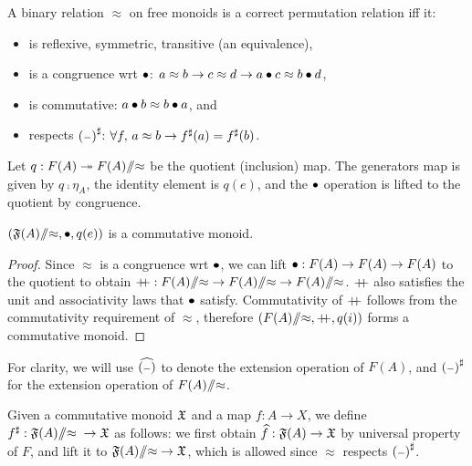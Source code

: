 \begin{definition}
    \label{def:permutation-relation}
    \leavevmode
    A binary relation $\approx$ on free monoids is a correct permutation relation iff it:
    \begin{itemize}
        \item is reflexive, symmetric, transitive (an equivalence),
        \item is a congruence wrt $\mathbin{\bullet}$: $a \approx b \to c \approx d \to a \mathbin{\bullet} c \approx b \mathbin{\bullet} d$,
        \item is commutative: $a \mathbin{\bullet} b \approx b \mathbin{\bullet} a$, and
        \item respects $\ext{(\blank)}$: $\forall f, \, a \approx b \to {f}^{\sharp}(a) = {f}^{\sharp}(b)$.
    \end{itemize}
\end{definition}

Let $q : F(A) \twoheadrightarrow {F(A)}{\sslash}{\approx}$ be the quotient (inclusion) map.
%
The generators map is given by $q \comp \eta_A$, the identity element is $q(e)$,
and the $\mathbin{\bullet}$ operation is lifted to the quotient by congruence.

\begin{propositionrep}
    $({\mathfrak{F}(A)}{\sslash}{\approx}, \mathbin{\bullet}, q(e))$ is a commutative monoid.
\end{propositionrep}
\begin{proof}
    Since $\approx$ is a congruence wrt $\mathbin{\bullet}$,
    we can lift $\mathbin{\bullet} : F(A) \to F(A) \to F(A)$ to the quotient to obtain
    $\mathbin{+\kern -0.4em+} : {F(A)}{\sslash}{\approx} \to {F(A)}{\sslash}{\approx} \to {F(A)}{\sslash}{\approx}$.
    $\mathbin{+\kern -0.4em+}$ also satisfies the unit and associativity laws that $\mathbin{\bullet}$ satisfy.
    Commutativity of $\mathbin{+\kern -0.4em+}$ follows from the commutativity requirement of $\approx$,
    therefore $({F(A)}{\sslash}{\approx}, \mathbin{+\kern -0.4em+}, q(i))$ forms a commutative monoid.
\end{proof}
\noindent
For clarity, we will use $\exthat{(\blank)}$ to denote the extension operation of $F(A)$,
and $\ext{(\blank)}$ for the extension operation of ${F(A)}{\sslash}{\approx}$.

\begin{definition}
    Given a commutative monoid $\mathfrak{X}$ and a map $f : A \to X$,
    we define
    ${f}^{\sharp} : {\mathfrak{F}(A)}{\sslash}{\approx} \; \to \mathfrak{X}$ as follows:
    we first obtain $\widehat{f} : \mathfrak{F}(A) \to \mathfrak{X}$ by universal property of $F$, and lift it
    to ${\mathfrak{F}(A)}{\sslash}{\approx} \to \mathfrak{X}$, which is allowed since $\approx$ respects $\ext{(\blank)}$.
\end{definition}

